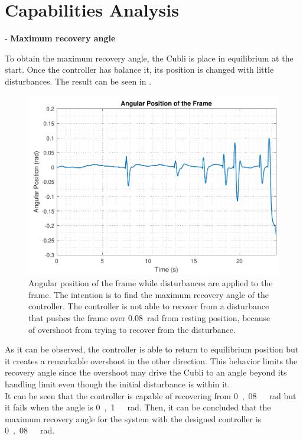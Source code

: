 \section{Capabilities Analysis}
- \textbf{Maximum recovery angle}

To obtain the maximum recovery angle, the Cubli is place in equilibrium at the start. Once the controller has balance it, its position is changed with little disturbances. The result can be seen in .

\begin{figure}[H]
	\centering
	\includegraphics[scale=0.62]{figures/testRecovery}
	\caption{Angular position of the frame while disturbances are applied to the frame. The intention is to find the maximum recovery angle of the controller. The controller is not able to recover from a disturbance that pushes the frame over \SI{0,08}{rad} from resting position, because of overshoot from trying to recover from the disturbance.}
	\label{testRecovery}
\end{figure}\vspace{-5mm}
%
As it can be observed, the controller is able to return to equilibrium position but it creates a remarkable overshoot in the other direction. This behavior limits the recovery angle since the overshoot may drive the Cubli to an angle beyond its handling limit even though the initial disturbance is within it.\\
It can be seen that the controller is capable of recovering from \si{0,08\ rad} but it fails when the angle is \si{0,1\ rad}. Then, it can be concluded that the maximum recovery angle for the system with the designed controller is \si{0,08\ rad}.

